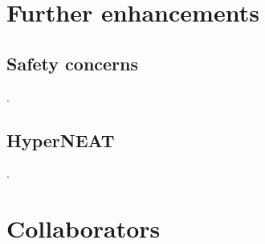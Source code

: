 \documentclass[11pt]{article}
\begin{document}
	\section{Further enhancements}
		\subsection{Safety concerns}
			.
		\subsection{HyperNEAT}
			.
	\newline

	\section{Collaborators}
		
	\newline

	\nocite{*}
	{\RaggedRight
		
		
	}
\end{document}
